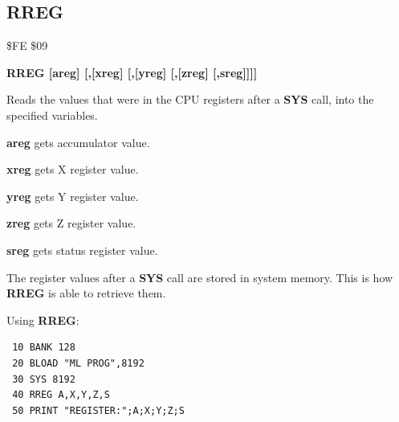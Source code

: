 
\newpage
\subsection{RREG}
\begin{description}[leftmargin=2cm,style=nextline]
\item [Token:] \$FE \$09
\item [Format:] {\bf RREG [areg] [,[xreg] [,[yreg] [,[zreg] [,sreg]]]]}
\item [Usage:] Reads the values that were in the CPU registers
               after a {\bf SYS} call, into the specified variables.

               {\bf areg} gets accumulator value.

               {\bf xreg} gets X register value.

               {\bf yreg} gets Y register value.

               {\bf zreg} gets Z register value.

               {\bf sreg} gets status register value.

\item [Remarks:] The register values after a {\bf SYS} call are stored
                 in system memory. This is how
                 {\bf RREG} is able to retrieve them.

\item [Example:] Using {\bf RREG}:
\begin{tcolorbox}[colback=black,coltext=white]
\verbatimfont{\codefont}
\begin{verbatim}
 10 BANK 128
 20 BLOAD "ML PROG",8192
 30 SYS 8192
 40 RREG A,X,Y,Z,S
 50 PRINT "REGISTER:";A;X;Y;Z;S
\end{verbatim}
\end{tcolorbox}
\end{description}


\newpage
